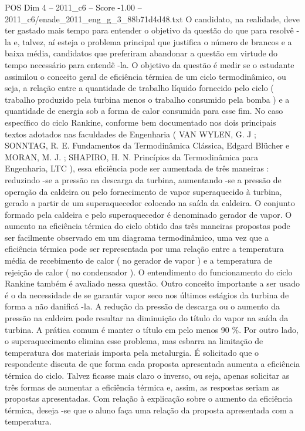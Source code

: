 \begin{textsample}{POS Dim 4 – 2011\_c6 – Score -1.00 – 2011\_c6/enade\_2011\_eng\_g\_3\_88b71d4d48.txt}
O candidato, na realidade, deve ter gastado mais tempo para entender o objetivo da questão do que para resolvê -la e, talvez, aí esteja o problema principal que justifica o número de brancos e a baixa média, candidatos que preferiram abandonar a questão em virtude do tempo necessário para entendê -la.
O objetivo da questão é medir se o estudante assimilou o conceito geral de eficiência térmica de um ciclo termodinâmico, ou seja, a relação entre a quantidade de trabalho líquido fornecido pelo ciclo ( trabalho produzido pela turbina menos o trabalho consumido pela bomba ) e a quantidade de energia sob a forma de calor consumida para esse fim.
No caso específico do ciclo Rankine, conforme bem documentado nos dois principais textos adotados nas faculdades de Engenharia ( VAN WYLEN, G.
J ; SONNTAG, R.
E.
Fundamentos da Termodinâmica Clássica, Edgard Blücher e MORAN, M.
J. ; SHAPIRO, H.
N.
Princípios da Termodinâmica para Engenharia, LTC ), essa eficiência pode ser aumentada de três maneiras : reduzindo -se a pressão na descarga da turbina, aumentando -se a pressão de operação da caldeira ou pelo fornecimento de vapor superaquecido à turbina, gerado a partir de um superaquecedor colocado na saída da caldeira.
O conjunto formado pela caldeira e pelo superaquecedor é denominado gerador de vapor.
O aumento na eficiência térmica do ciclo obtido das três maneiras propostas pode ser facilmente observado em um diagrama termodinâmico, uma vez que a eficiência térmica pode ser representada por uma relação entre a temperatura média de recebimento de calor ( no gerador de vapor ) e a temperatura de rejeição de calor ( no condensador ).
O entendimento do funcionamento do ciclo Rankine também é avaliado nessa questão.
Outro conceito importante a ser usado é o da necessidade de se garantir vapor seco nos últimos estágios da turbina de forma a não danificá -la.
A redução da pressão de descarga ou o aumento da pressão na caldeira pode resultar na diminuição do título do vapor na saída da turbina.
A prática comum é manter o título em pelo menos 90 \%.
Por outro lado, o superaquecimento elimina esse problema, mas esbarra na limitação de temperatura dos materiais imposta pela metalurgia.
É solicitado que o respondente discuta de que forma cada proposta apresentada aumenta a eficiência térmica do ciclo.
Talvez ficasse mais claro o inverso, ou seja, apenas solicitar as três formas de aumentar a eficiência térmica e, assim, as respostas seriam as propostas apresentadas.
Com relação à explicação sobre o aumento da eficiência térmica, deseja -se que o aluno faça uma relação da proposta apresentada com a temperatura.

\end{textsample}
